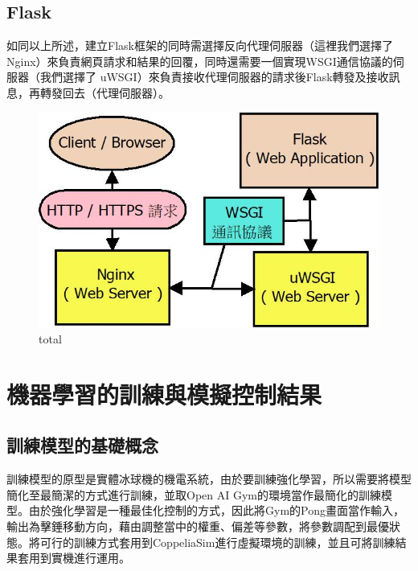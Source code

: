 \documentclass[14pt,a4paper]{report}  %
\begin{document}
\section{Flask}
 
 如同以上所述，建立Flask框架的同時需選擇反向代理伺服器（這裡我們選擇了Nginx）來負責網頁請求和結果的回覆，同時還需要一個實現WSGI通信協議的伺服器（我們選擇了 uWSGI）來負責接收代理伺服器的請求後Flask轉發及接收訊息，再轉發回去（代理伺服器）。\\
 
\begin{figure}[hbt!]
\begin{center}
\includegraphics[scale=0.74]{total}
\caption{\Large total}\label{total}
\end{center}
\end{figure}

\chapter{機器學習的訓練與模擬控制結果}
\section{訓練模型的基礎概念}
 訓練模型的原型是實體冰球機的機電系統，由於要訓練強化學習，所以需要將模型簡化至最簡潔的方式進行訓練，並取Open AI Gym的環境當作最簡化的訓練模型。由於強化學習是一種最佳化控制的方式，因此將Gym的Pong畫面當作輸入，輸出為擊錘移動方向，藉由調整當中的權重、偏差等參數，將參數調配到最優狀態。將可行的訓練方式套用到CoppeliaSim進行虛擬環境的訓練，並且可將訓練結果套用到實機進行運用。\\
\end{document}

